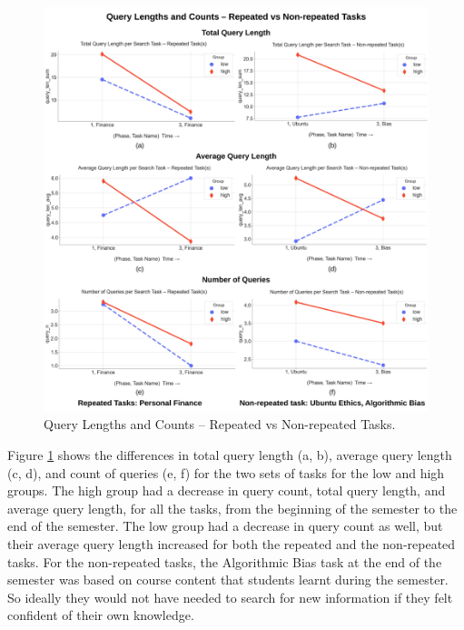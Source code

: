 \documentclass[letterpaper, nobind]{templates/ociamthesis}
\begin{document}
\begin{figure}

{\centering \includegraphics[width=1\linewidth]{figs/rp13-query-length-count} 

}

\caption[Query Lengths and Counts -- Repeated vs Non-repeated Tasks.]{Query Lengths and Counts -- Repeated vs Non-repeated Tasks.}\label{fig:rp13-query-length-count}
\end{figure}





Figure \ref{fig:rp13-query-length-count} shows the differences in total query length (a, b), average query length (c, d), and count of queries (e, f) for the two sets of tasks for the low and high groups.
The high group had a decrease in query count, total query length, and average query length, for all the tasks, from the beginning of the semester to the end of the semester.
The low group had a decrease in query count as well, but their average query length increased for both the repeated and the non-repeated tasks.
For the non-repeated tasks, the Algorithmic Bias task at the end of the semester was based on course content that students learnt during the semester.
So ideally they would not have needed to search for new information if they felt confident of their own knowledge.
\end{document}
